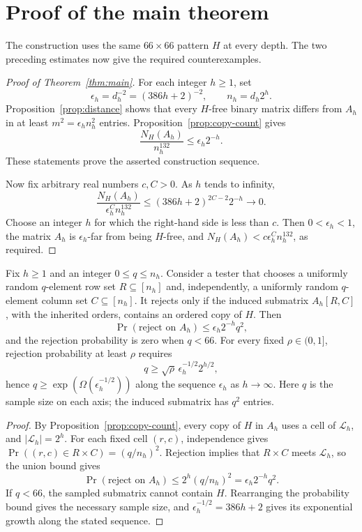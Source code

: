 \section{Proof of the main theorem}
\label{sec:conclusion}

The construction uses the same $66\times 66$ pattern $H$ at every depth.
The two preceding estimates now give the required counterexamples.

\begin{proof}[Proof of Theorem~\ref{thm:main}]
For each integer $h\geq1$, set
\[
 \epsilon_h=d_h^{-2}=(386h+2)^{-2},
 \qquad n_h=d_h2^h.
\]
Proposition~\ref{prop:distance} shows that every $H$-free binary matrix
differs from $A_h$ in at least $m^2=\epsilon_h n_h^2$ entries.
Proposition~\ref{prop:copy-count} gives
\[
 \frac{N_H(A_h)}{n_h^{132}}
 \leq \epsilon_h2^{-h}.
\]
These statements prove the asserted construction sequence.

Now fix arbitrary real numbers $c,C>0$.  As $h$ tends to infinity,
\[
 \frac{N_H(A_h)}{\epsilon_h^C n_h^{132}}
 \leq (386h+2)^{2C-2}2^{-h}
 \longrightarrow 0.
\]
Choose an integer $h$ for which the right-hand side is less than $c$.
Then $0<\epsilon_h<1$, the matrix $A_h$ is $\epsilon_h$-far from being
$H$-free, and
$N_H(A_h)<c\epsilon_h^C n_h^{132}$, as required.
\end{proof}

\begin{corollary}
\label{cor:canonical-testing}
Fix $h\ge1$ and an integer $0\le q\le n_h$. Consider a tester that
chooses a uniformly random $q$-element row set $R\subseteq[n_h]$ and,
independently, a uniformly random $q$-element column set
$C\subseteq[n_h]$. It rejects only if the induced submatrix $A_h[R,C]$,
with the inherited orders, contains an ordered copy of $H$. Then
\[
 \Pr(\text{reject on }A_h)\le\epsilon_h2^{-h}q^2,
\]
and the rejection probability is zero when $q<66$. For every fixed
$\rho\in(0,1]$, rejection probability at least $\rho$ requires
\[
 q\ge\sqrt{\rho}\,\epsilon_h^{-1/2}2^{h/2},
\]
hence $q\ge\exp(\Omega(\epsilon_h^{-1/2}))$ along the sequence
$\epsilon_h$ as $h\to\infty$. Here $q$ is the sample size on each axis;
the induced submatrix has $q^2$ entries.
\end{corollary}

\begin{proof}
By Proposition~\ref{prop:copy-count}, every copy of $H$ in $A_h$ uses a
cell of $\mathcal L_h$, and $|\mathcal L_h|=2^h$. For each fixed cell
$(r,c)$, independence gives
$\Pr((r,c)\in R\times C)=(q/n_h)^2$. Rejection implies that
$R\times C$ meets $\mathcal L_h$, so the union bound gives
\[
 \Pr(\text{reject on }A_h)
 \le 2^h(q/n_h)^2=\epsilon_h2^{-h}q^2.
\]
If $q<66$, the sampled submatrix cannot contain $H$. Rearranging the
probability bound gives the necessary sample size, and
$\epsilon_h^{-1/2}=386h+2$ gives its exponential growth along the
stated sequence.
\end{proof}
